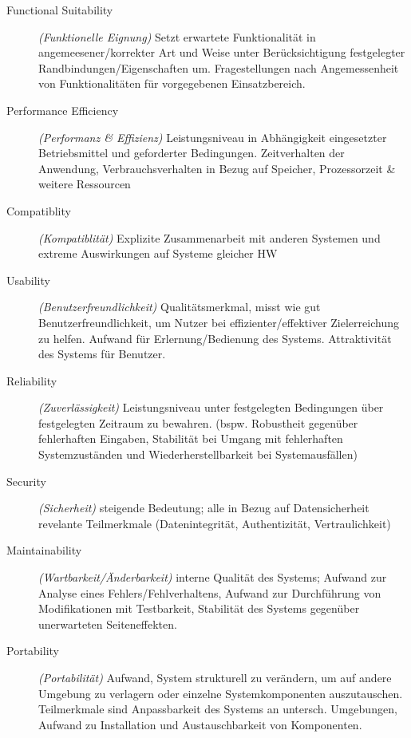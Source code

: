 \documentclass[a4paper]{article}
\begin{document}
			\begin{description}
				\item[Functional Suitability] \textit{(Funktionelle Eignung)} 
				Setzt erwartete Funktionalität in angemeesener/korrekter Art und Weise unter Berücksichtigung festgelegter Randbindungen/Eigenschaften um.
				Fragestellungen nach Angemessenheit von Funktionalitäten für vorgegebenen Einsatzbereich.
				
				\item[Performance Efficiency] \textit{(Performanz \& Effizienz)} 
				Leistungsniveau in Abhängigkeit eingesetzter Betriebsmittel und geforderter Bedingungen.
				Zeitverhalten der Anwendung, Verbrauchsverhalten in Bezug auf Speicher, Prozessorzeit \& weitere Ressourcen
				
				\item[Compatiblity] \textit{(Kompatiblität)} 
				Explizite Zusammenarbeit mit anderen Systemen und extreme Auswirkungen auf Systeme gleicher HW
				
				\item[Usability] \textit{(Benutzerfreundlichkeit)} 
				Qualitätsmerkmal, misst wie gut Benutzerfreundlichkeit, um Nutzer bei effizienter/effektiver Zielerreichung zu helfen.
				Aufwand für Erlernung/Bedienung des Systems.
				Attraktivität des Systems für Benutzer.
				
				\item[Reliability] \textit{(Zuverlässigkeit)}
				Leistungsniveau unter festgelegten Bedingungen über festgelegten Zeitraum zu bewahren.
				(bspw. Robustheit gegenüber fehlerhaften Eingaben, Stabilität bei Umgang mit fehlerhaften Systemzuständen und Wiederherstellbarkeit bei Systemausfällen)
				
				\item[Security] \textit{(Sicherheit)}
				steigende Bedeutung;
				alle in Bezug auf Datensicherheit revelante Teilmerkmale (Datenintegrität, Authentizität, Vertraulichkeit)
				
				\item[Maintainability] \textit{(Wartbarkeit/Änderbarkeit)}
				interne Qualität des Systems;
				Aufwand zur Analyse eines Fehlers/Fehlverhaltens, Aufwand zur Durchführung von Modifikationen mit Testbarkeit, Stabilität des Systems gegenüber unerwarteten Seiteneffekten.
				
				\item[Portability] \textit{(Portabilität)}
				Aufwand, System strukturell zu verändern, um auf andere Umgebung zu verlagern oder einzelne Systemkomponenten auszutauschen.
				Teilmerkmale sind Anpassbarkeit des Systems an untersch. Umgebungen, Aufwand zu Installation und Austauschbarkeit von Komponenten.
				
			\end{description}
		
\end{document}

